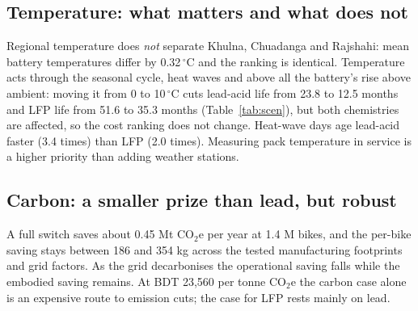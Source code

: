 \documentclass[11pt,a4paper]{article}
\newcommand{\Tspread}{0.32}
\newcommand{\heatLA}{3.4}
\newcommand{\heatLFP}{2.0}
\newcommand{\fleetA}{0.45}
\newcommand{\abateCarbon}{23{,}560}
\newcommand{\sensMin}{186}
\newcommand{\sensMax}{354}
\begin{document}
\subsection{Temperature: what matters and what does not}
Regional temperature does \emph{not} separate Khulna, Chuadanga and Rajshahi: mean battery temperatures differ by \Tspread\,$^\circ$C and the ranking is identical. Temperature acts through the seasonal cycle, heat waves and above all the battery's rise above ambient: moving it from 0 to 10\,$^\circ$C cuts lead-acid life from 23.8 to 12.5 months and LFP life from 51.6 to 35.3 months (Table~\ref{tab:scen}), but both chemistries are affected, so the cost ranking does not change. Heat-wave days age lead-acid faster (\heatLA{} times) than LFP (\heatLFP{} times). Measuring pack temperature in service is a higher priority than adding weather stations.

\subsection{Carbon: a smaller prize than lead, but robust}
A full switch saves about \fleetA{} Mt CO$_2$e per year at 1.4 M bikes, and the per-bike saving stays between \sensMin{} and \sensMax{} kg across the tested manufacturing footprints and grid factors. As the grid decarbonises the operational saving falls while the embodied saving remains. At BDT \abateCarbon{} per tonne CO$_2$e the carbon case alone is an expensive route to emission cuts; the case for LFP rests mainly on lead.
\end{document}
